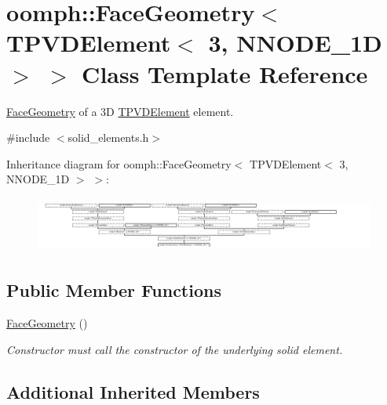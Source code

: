 \hypertarget{classoomph_1_1FaceGeometry_3_01TPVDElement_3_013_00_01NNODE__1D_01_4_01_4}{}\section{oomph\+:\+:Face\+Geometry$<$ T\+P\+V\+D\+Element$<$ 3, N\+N\+O\+D\+E\+\_\+1D $>$ $>$ Class Template Reference}
\label{classoomph_1_1FaceGeometry_3_01TPVDElement_3_013_00_01NNODE__1D_01_4_01_4}


\hyperlink{classoomph_1_1FaceGeometry}{Face\+Geometry} of a 3D \hyperlink{classoomph_1_1TPVDElement}{T\+P\+V\+D\+Element} element.  




{\ttfamily \#include $<$solid\+\_\+elements.\+h$>$}

Inheritance diagram for oomph\+:\+:Face\+Geometry$<$ T\+P\+V\+D\+Element$<$ 3, N\+N\+O\+D\+E\+\_\+1D $>$ $>$\+:\begin{figure}[H]
\begin{center}
\leavevmode
\includegraphics[height=1.840375cm]{classoomph_1_1FaceGeometry_3_01TPVDElement_3_013_00_01NNODE__1D_01_4_01_4}
\end{center}
\end{figure}
\subsection*{Public Member Functions}
\begin{DoxyCompactItemize}
\item 
\hyperlink{classoomph_1_1FaceGeometry_3_01TPVDElement_3_013_00_01NNODE__1D_01_4_01_4_a8344ec652edb704ef7fc4d691cd20a93}{Face\+Geometry} ()
\begin{DoxyCompactList}\small\item\em Constructor must call the constructor of the underlying solid element. \end{DoxyCompactList}\end{DoxyCompactItemize}
\subsection*{Additional Inherited Members}


